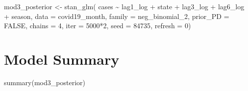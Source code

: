 \documentclass[
]{book}
\newenvironment{Shaded}{\begin{snugshade}}{\end{snugshade}}
\newcommand{\AttributeTok}[1]{\textcolor[rgb]{0.77,0.63,0.00}{#1}}
\newcommand{\ConstantTok}[1]{\textcolor[rgb]{0.00,0.00,0.00}{#1}}
\newcommand{\DecValTok}[1]{\textcolor[rgb]{0.00,0.00,0.81}{#1}}
\newcommand{\FunctionTok}[1]{\textcolor[rgb]{0.00,0.00,0.00}{#1}}
\newcommand{\NormalTok}[1]{#1}
\newcommand{\OtherTok}[1]{\textcolor[rgb]{0.56,0.35,0.01}{#1}}
\newcommand{\SpecialCharTok}[1]{\textcolor[rgb]{0.00,0.00,0.00}{#1}}
\begin{document}
\begin{Shaded}
\begin{Highlighting}[]
\NormalTok{mod3\_posterior }\OtherTok{\textless{}{-}} \FunctionTok{stan\_glm}\NormalTok{(}
\NormalTok{  cases }\SpecialCharTok{\textasciitilde{}}\NormalTok{ lag1\_log }\SpecialCharTok{+}\NormalTok{ state }\SpecialCharTok{+}\NormalTok{ lag3\_log }\SpecialCharTok{+}\NormalTok{ lag6\_log }\SpecialCharTok{+}\NormalTok{ season, }\AttributeTok{data =}\NormalTok{ covid19\_month,}
  \AttributeTok{family =}\NormalTok{ neg\_binomial\_2,}
  \AttributeTok{prior\_PD =} \ConstantTok{FALSE}\NormalTok{,}
  \AttributeTok{chains =} \DecValTok{4}\NormalTok{, }\AttributeTok{iter =} \DecValTok{5000}\SpecialCharTok{*}\DecValTok{2}\NormalTok{, }\AttributeTok{seed =} \DecValTok{84735}\NormalTok{, }\AttributeTok{refresh =} \DecValTok{0}\NormalTok{)}
\end{Highlighting}
\end{Shaded}

\hypertarget{model-summary}{%
\section{Model Summary}\label{model-summary}}

\begin{Shaded}
\begin{Highlighting}[]
\FunctionTok{summary}\NormalTok{(mod3\_posterior)}
\end{Highlighting}
\end{Shaded}
\end{document}

